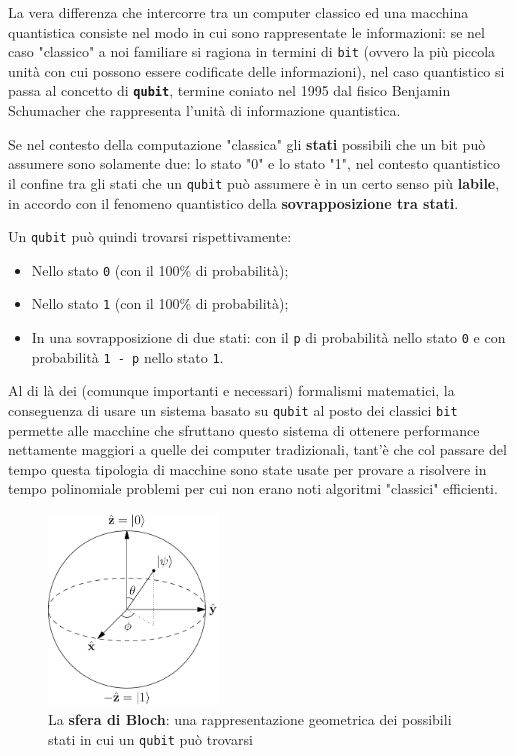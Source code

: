 \documentclass[a4paper, 12pt, oneside]{article}
\theoremstyle{definition}
\begin{document}
La vera differenza che intercorre tra un computer classico ed una macchina quantistica consiste nel modo in cui sono rappresentate le informazioni: se nel caso "classico" a noi familiare si ragiona in termini di \texttt{bit} (ovvero la più piccola unità con cui possono essere codificate delle informazioni), nel caso quantistico si passa al concetto di \texttt{\textbf{qubit}}, termine coniato nel 1995 \cite{PhysRevA.51.2738} dal fisico Benjamin Schumacher che rappresenta l'unità di informazione quantistica. 

Se nel contesto della computazione "classica" gli \textbf{stati} possibili che un bit può assumere sono solamente due: lo stato "0" e lo stato "1", nel contesto quantistico il confine tra gli stati che un \texttt{qubit} può assumere è in un certo senso più \textbf{labile}, in accordo con il fenomeno quantistico della \textbf{sovrapposizione tra stati}.

Un \texttt{qubit} può quindi trovarsi rispettivamente:

\begin{itemize}
    \item Nello stato \texttt{0} (con il 100\% di probabilità);
    \item Nello stato \texttt{1} (con il 100\% di probabilità);
    \item In una sovrapposizione di due stati: con il \texttt{p} di probabilità nello stato \texttt{0} e con probabilità \texttt{1 - p} nello stato \texttt{1}.
\end{itemize}

Al di là dei (comunque importanti e necessari) formalismi matematici, la conseguenza di usare un sistema basato su \texttt{qubit} al posto dei classici \texttt{bit} permette alle macchine che sfruttano questo sistema di ottenere performance nettamente maggiori a quelle dei computer tradizionali, tant'è che col passare del tempo questa tipologia di macchine sono state usate per provare a risolvere in tempo polinomiale problemi per cui non erano noti algoritmi "classici" efficienti.

\begin{figure}[H]
    \centering
    \includegraphics[width=0.4\textwidth]{images/1280px-Bloch_Sphere.svg.png}
    \caption{La \textbf{sfera di Bloch}: una rappresentazione geometrica dei possibili stati in cui un \texttt{qubit} può trovarsi}
\end{figure}
\end{document}
